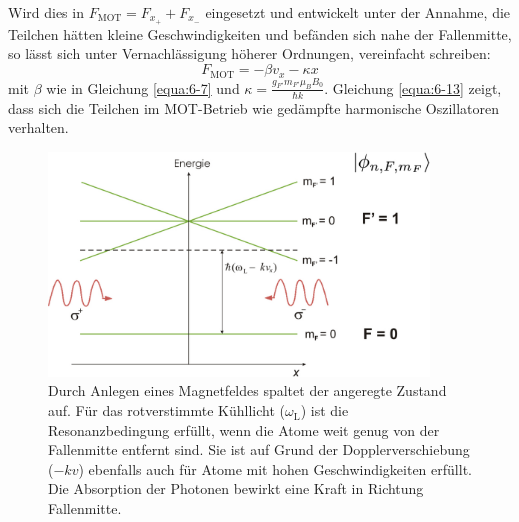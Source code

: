 \documentclass[
class=book,
accentcolor=1b,
custommargins=geometry,
fontsize=11pt,
thesis={type=Versuchsanleitung},
ruledheaders=all,
headline=false,
instbox=false,
marginpar=false,
title=small,
ignore-missing-data=true,
twoside=false,
logofile=apqdesign/tuda_logo.pdf,
pdfa=false %
]{apqpub}
\newtheorem{frage}[satz]{Frage}
\begin{document}
				Wird dies in $F_{\text{MOT}} = F_{x_+} + F_{x_-}$ eingesetzt und entwickelt unter der Annahme, die Teilchen hätten kleine Geschwindigkeiten und befänden sich nahe der Fallenmitte, so lässt sich unter Vernachlässigung höherer Ordnungen, vereinfacht schreiben:			
				\begin{equation}\label{equa:6-13}
				F_{\text{MOT}} = -\beta v_x  -\kappa x
				\end{equation}				
				mit $\beta$ wie in Gleichung \eqref{equa:6-7} und $\kappa = \frac{g_{F'} m_{F'} \mu_B B_0}{\hbar k}$. Gleichung \eqref{equa:6-13} zeigt, dass sich die Teilchen im MOT-Betrieb wie gedämpfte harmonische Oszillatoren verhalten.\\
				
				\begin{figure}[htb!]
					\centering
					\includegraphics[width = 0.9\textwidth]{graphics/FA.jpg}
					\caption{Durch Anlegen eines Magnetfeldes spaltet der angeregte Zustand auf. Für das rotverstimmte Kühllicht ($\omega_{\text{L}}$) ist die Resonanzbedingung erfüllt, wenn die Atome weit genug von der Fallenmitte entfernt sind. Sie ist auf Grund der Dopplerverschiebung ($-kv$) ebenfalls auch für Atome mit hohen Geschwindigkeiten erfüllt. Die Absorption der Photonen bewirkt eine Kraft in Richtung Fallenmitte.}
					\label{fig:FA}
				\end{figure}				
				\\
				
\end{document}

